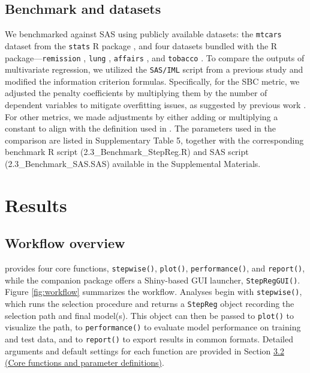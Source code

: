 \subsection{Benchmark and datasets}\label{benchmark-and-datasets}

We benchmarked  against SAS using publicly available datasets: the \texttt{mtcars} dataset from the \texttt{stats} R package \citep{RN75}, and four datasets bundled with the  R package---\texttt{remission} \citep{RN97}, \texttt{lung} \citep{RN88, RN87}, \texttt{affairs} \citep{RN1001}, and \texttt{tobacco} \citep{RN115}. To compare the outputs of multivariate regression, we utilized the \texttt{SAS/IML} script from a previous study \citep{RN4} and modified the information criterion formulas. Specifically, for the SBC metric, we adjusted the penalty coefficients by multiplying them by the number of dependent variables to mitigate overfitting issues, as suggested by previous work \citep{RN116}. For other metrics, we made adjustments by either adding or multiplying a constant to align with the definition used in . The parameters used in the comparison are listed in Supplementary Table 5, together with the corresponding benchmark R script (2.3\_Benchmark\_StepReg.R) and SAS script (2.3\_Benchmark\_SAS.SAS) available in the Supplemental Materials.

\section{Results}\label{results}

\subsection{Workflow overview}\label{workflow-overview}

 provides four core functions, \texttt{stepwise()}, \texttt{plot()}, \texttt{performance()}, and \texttt{report()}, while the companion package  offers a Shiny-based GUI launcher, \texttt{StepRegGUI()}. Figure \ref{fig:workflow} summarizes the workflow. Analyses begin with \texttt{stepwise()}, which runs the selection procedure and returns a \texttt{StepReg} object recording the selection path and final model(s). This object can then be passed to \texttt{plot()} to visualize the path, to \texttt{performance()} to evaluate model performance on training and test data, and to \texttt{report()} to export results in common formats. Detailed arguments and default settings for each function are provided in Section \hyperref[usage]{3.2 (Core functions and parameter definitions)}.

